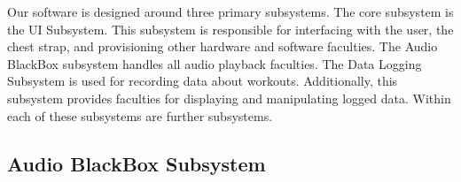     Our software is designed around three primary subsystems. The core subsystem is the UI Subsystem. This subsystem is responsible for interfacing with the user, the chest strap, and provisioning other hardware and software faculties. The Audio BlackBox subsystem handles all audio playback faculties. The Data Logging Subsystem is used for recording data about workouts. Additionally, this subsystem provides faculties for displaying and manipulating logged data. Within each of these subsystems are further subsystems.
    
\subsection{Audio BlackBox Subsystem}
    